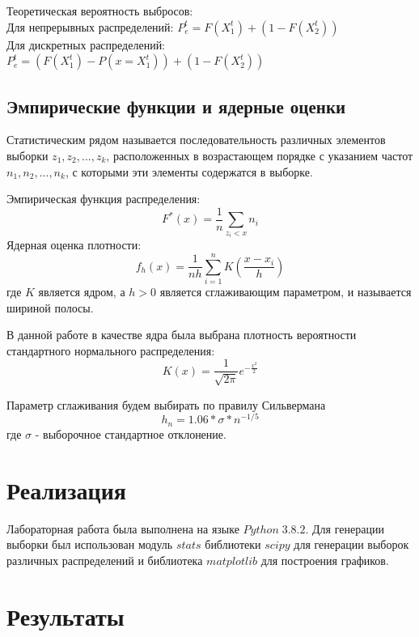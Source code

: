 \documentclass[a4]{article}
\begin{document}
Теоретическая вероятность выбросов:\\
Для непрерывных распределений:
$P^{t}_{e} = F(X_{1}^{t}) + (1 - F(X_{2}^{t}))$\\
Для дискретных распределений:
$P^{t}_{e} = (F(X_{1}^{t}) - P(x=X_{1}^{t})) + (1 - F(X_{2}^{t}))$

\subsection{Эмпирические функции и ядерные оценки}

Статистическим рядом называется последовательность различных элементов выборки $z_{1}, z_{2}, ... , z_{k}$, расположенных в возрастающем порядке с указанием частот $n_{1}, n_{2}, ... , n_{k}$, с которыми эти элементы содержатся в выборке.

Эмпирическая функция распределения:
\begin{equation}
F^{*}(x) = \dfrac{1}{n}\sum\limits_{z_{i}<x}n_{i}
\end{equation}
Ядерная оценка плотности:
\begin{equation}
f_h(x) = \frac{1}{nh}\sum\limits_{i=1}^nK\left(\frac{x-x_i}{h}\right)\label{eqn:art}
\end{equation}
где $K$ является ядром, а $h>0$ является сглаживающим параметром, и называется шириной полосы.

В данной работе в качестве ядра была выбрана плотность вероятности стандартного нормального распределения:
\begin{equation}
K(x) = \frac{1}{\sqrt{2\pi}}e^{-\frac{x^2}{2}}
\end{equation}

Параметр сглаживания будем выбирать по правилу Сильвермана
\begin{equation}
h_{n} = 1.06*\sigma*n^{-1/5}
\end{equation}
где $ \sigma $ - выборочное стандартное отклонение.

\section{Реализация}
Лабораторная работа была выполнена на языке $Python\;3.8.2$.
Для генерации выборки был использован модуль $stats$ библиотеки $scipy$ для генерации выборок различных распределений и библиотека $matplotlib$ для построения графиков.

\newpage
\section{Результаты}
\end{document}
